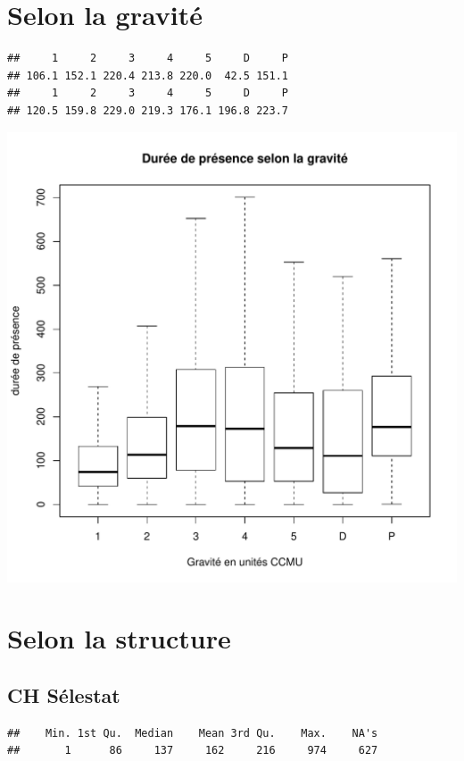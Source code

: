 \documentclass[12pt,english,french,twoside]{report}\usepackage[]{graphicx}\usepackage[]{color}
\makeatletter
\def\maxwidth{ %
  \ifdim\Gin@nat@width>\linewidth
    \linewidth
  \else
    \Gin@nat@width
  \fi
}
\newenvironment{kframe}{%
 \def\at@end@of@kframe{}%
 \ifinner\ifhmode%
  \def\at@end@of@kframe{\end{minipage}}%
  \begin{minipage}{\columnwidth}%
 \fi\fi%
 \def\FrameCommand##1{\hskip\@totalleftmargin \hskip-\fboxsep
 \colorbox{shadecolor}{##1}\hskip-\fboxsep
     \hskip-\linewidth \hskip-\@totalleftmargin \hskip\columnwidth}%
 \MakeFramed {\advance\hsize-\width
   \@totalleftmargin\z@ \linewidth\hsize
   \@setminipage}}%
 {\par\unskip\endMakeFramed%
 \at@end@of@kframe}
\newenvironment{knitrout}{}{} %
\makeatother
\begin{document}
\section*{Selon la gravité}
\begin{knitrout}
\color{fgcolor}\begin{kframe}
\begin{verbatim}
##     1     2     3     4     5     D     P 
## 106.1 152.1 220.4 213.8 220.0  42.5 151.1
##     1     2     3     4     5     D     P 
## 120.5 159.8 229.0 219.3 176.1 196.8 223.7
\end{verbatim}
\end{kframe}
\includegraphics[width=\maxwidth]{figure/duree_gravite} 

\end{knitrout}


\section*{Selon la structure}
\subsection{CH Sélestat}
\begin{knitrout}
\color{fgcolor}\begin{kframe}
\begin{verbatim}
##    Min. 1st Qu.  Median    Mean 3rd Qu.    Max.    NA's 
##       1      86     137     162     216     974     627
\end{verbatim}
\end{kframe}
\end{knitrout}
\end{document}
